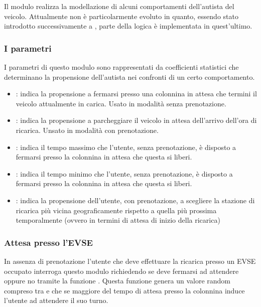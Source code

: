 Il modulo realizza la modellazione di alcuni comportamenti dell'autista del veicolo. Attualmente non è particolarmente evoluto in quanto, essendo stato introdotto successivamente a , parte della logica è implementata in quest'ultimo.

\subsubsection{I parametri}

I parametri di questo modulo sono rappresentati da coefficienti statistici che determinano la propensione dell'autista nei confronti di un certo comportamento.

\begin{itemize}
	\item {}: indica la propensione a fermarsi presso una colonnina in attesa che termini il veicolo attualmente in carica. Usato in modalità senza prenotazione.
	\item {}: indica la propensione a parcheggiare il veicolo in attesa dell'arrivo dell'ora di ricarica. Unsato in modalità con prenotazione.
	\item {}: indica il tempo massimo che l'utente, senza prenotazione, è disposto a fermarsi presso la colonnina in attesa che questa si liberi.
	\item {}: indica il tempo minimo che l'utente, senza prenotazione, è disposto a fermarsi presso la colonnina in attesa che questa si liberi.
	\item {}: indica la propensione dell'utente, con prenotazione, a scegliere la stazione di ricarica più vicina geograficamente rispetto a quella più prossima temporalmente (ovvero in termini di attesa di inizio della ricarica)
\end{itemize}

\subsubsection{Attesa presso l'EVSE}

In assenza di prenotazione l'utente che deve effettuare la ricarica presso un EVSE occupato interroga questo modulo richiedendo se deve fermarsi ad attendere oppure no tramite la funzione . Questa funzione genera un valore random compreso tra  e  che se maggiore del tempo di attesa presso la colonnina induce l'utente ad attendere il suo turno.


